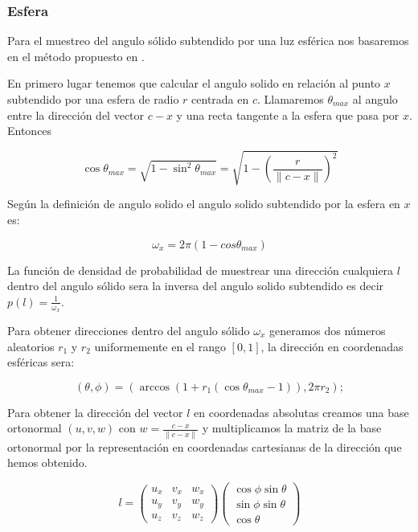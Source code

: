 \subsubsection{Esfera}

Para el muestreo del angulo sólido subtendido por una luz esférica nos basaremos en el método propuesto en \cite{Shirley1996}.

\medskip

En primero lugar tenemos que calcular el angulo solido en relación al punto $x$ subtendido por una esfera de radio $r$ centrada en $c$. Llamaremos $\theta_{max}$ al angulo entre la dirección del vector $c - x$ y una recta tangente a la esfera que pasa por $x$. Entonces

\begin{equation}
\cos \theta_{max} = \sqrt{1 - \sin^2 \theta_{max}} = \sqrt{ 1 - \left(\frac{r}{\lVert c - x \rVert} \right)^2 }
\end{equation}

Según la definición de angulo solido el angulo solido subtendido por la esfera en $x$ es:

\begin{equation}
\omega_x = 2\pi (1 - cos \theta_{max})
\end{equation}

La función de densidad de probabilidad de muestrear una dirección cualquiera $l$ dentro del angulo sólido sera la inversa del angulo solido subtendido es decir $p(l) = \frac{1}{\omega_x}$.

\medskip

Para obtener direcciones dentro del angulo sólido $\omega_x$ generamos dos números aleatorios $r_1$ y $r_2$ uniformemente en el rango $[0, 1]$, la dirección en coordenadas esféricas sera:

\begin{equation}
(\theta, \phi) = (\arccos (1 + r_1 (\cos \theta_{max} - 1)), 2\pi r_2);
\end{equation}

\clearpage

Para obtener la dirección del vector $l$ en coordenadas absolutas creamos una base ortonormal $(u, v, w)$ con $w = \frac{c - x}{\lVert c - x \rVert}$ y multiplicamos la matriz de la base ortonormal por la representación en coordenadas cartesianas de la dirección que hemos obtenido.

\begin{equation}
l = \begin{pmatrix}
u_x & v_x & w_x \\
u_y & v_y & w_y \\
u_z & v_z & w_z
\end{pmatrix}
\begin{pmatrix}
\cos \phi \sin \theta \\
\sin \phi \sin \theta \\
\cos \theta
\end{pmatrix}
\end{equation}






